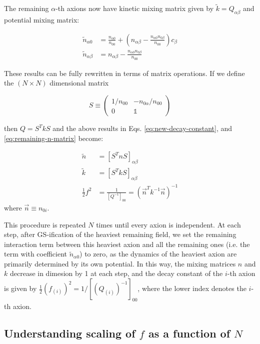 \documentclass[11pt]{article}
\begin{document}
The remaining $\alpha$-th axions now have kinetic mixing matrix given by $\tilde{k}= Q_{\alpha\beta}$ and potential mixing matrix:

\begin{align}
    \label{eq:remaining-n-matrix}
    \tilde{n}_{\alpha 0} & = \frac{n_{\alpha 0}}{n_{00}} + (n_{\alpha\beta}-\frac{n_{\alpha 0}n_{0 \beta}}{n_{00}})c_\beta\\
    \tilde{n}_{\alpha\beta} & = n_{\alpha\beta} - \frac{n_{\alpha 0}n_{0 \beta}}{n_{00}}
\end{align}

These results can be fully rewritten in terms of matrix operations. If we define the $(N\times N)$ dimensional matrix

\begin{equation}
    S \equiv \begin{pmatrix}
        1/n_{00} & -n_{0\alpha}/n_{00} \\
        0 & \mathbb{1}
    \end{pmatrix}
\end{equation}

\noindent then $Q = S^TkS$ and the above results in Eqs. \eqref{eq:new-decay-constant}, and \eqref{eq:remaining-n-matrix} become:

\begin{align}
    \tilde{n} & = [S^TnS]_{\alpha\beta} \\
    \tilde{k} & = [S^TkS]_{\alpha\beta} \\
    \frac{1}{2}f^2 & = \frac{1}{[Q^{-1}]_{00}}  = (\vec n^T k^{-1} \vec n)^{-1}\label{eq:f-matrix-version}
\end{align}
where $\vec{n} \equiv n_{0i}$.

This procedure is repeated $N$ times until every axion is independent. At each step, after GS-ification of the heaviest remaining field, we set the remaining interaction term between this heaviest axion and all the remaining ones (i.e. the term with coefficient $\tilde{n}_{\alpha 0}$) to zero, as the dynamics of the heaviest axion are primarily determined by its own potential. In this way, the mixing matrices $n$ and $k$ decrease in dimesion by 1 at each step, and the decay constant of the $i$-th axion is given by $\frac{1}{2}(f_{(i)})^2 = 1/[(Q_{(i)})^{-1}]_{00}$, where the lower index denotes the $i$-th axion.

\subsection{Understanding scaling of $f$ as a function of $N$}
\end{document}
